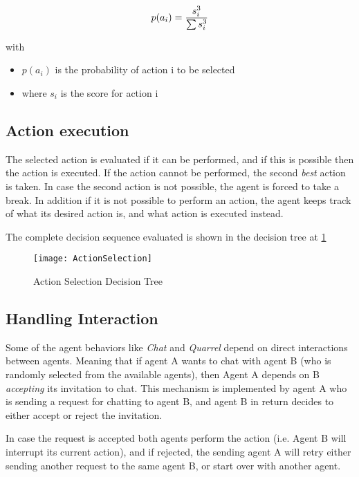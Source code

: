 \begin{equation}
    \label{eq2}
    p(a_i) = \frac{s_i^3}{\sum s_i^3} \\
\end{equation}

with
\begin{itemize}
    \item $p(a_i)$ is the probability of action i to be selected
    \item where $s_i$ is the score for action i
\end{itemize}

\subsection{Action execution}
The selected action is evaluated if it can be performed, and if this is possible
then the action is executed. If the action cannot be performed, the second \textit{best}
action is taken. In case the second action is not possible, the agent is forced
to take a break. In addition if it is not possible to perform an action, the agent
keeps track of what its desired action is, and what action is executed instead. 

The complete decision sequence evaluated is shown in the decision tree at \ref{ActionSectionFigure}

\begin{figure}[h]
    \centering
    \texttt{[image: ActionSelection]} 
    \caption{Action Selection Decision Tree}
    \label{ActionSectionFigure}
\end{figure}

\subsection{Handling Interaction}
Some of the agent behaviors like \textit{Chat} and \textit{Quarrel} depend on direct
interactions between agents. Meaning that if agent A wants to chat with agent B (who is
randomly selected from the available agents), then Agent A depends on B
\textit{accepting} its invitation to chat. This mechanism is implemented
by agent A who is sending a request for chatting to agent B, and agent B in return
decides to either accept or reject the invitation. 

In case the request is accepted both agents perform the action (i.e. Agent B will
interrupt its current action), and if rejected, the sending agent A will retry either
sending another request to the same agent B, or start over with another agent.

